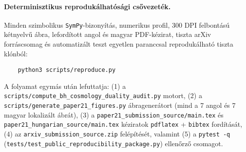 \documentclass[11pt,a4paper]{article}
\theoremstyle{remark}
\begin{document}
\paragraph{Determinisztikus reproduk\'alhat\'os\'agi cs\H{o}vezet\'ek.}
Minden szimbolikus \texttt{SymPy}-bizony\'it\'as, numerikus profil, 300 DPI felbont\'as\'u k\'etnyelv\H{u} \'abra, leford\'itott angol \'es magyar PDF-k\'ezirat, tiszta arXiv forr\'ascsomag \'es automatiz\'alt teszt egyetlen paranccsal reproduk\'alhat\'o tiszta kl\'onb\'ol:
\begin{verbatim}
    python3 scripts/reproduce.py
\end{verbatim}
A folyamat egym\'as ut\'an lefuttatja: (1) a \texttt{scripts/\allowbreak compute\_\allowbreak bh\_\allowbreak cosmology\_\allowbreak duality\_\allowbreak audit.py} motort, (2) a \texttt{scripts/\allowbreak generate\_\allowbreak paper21\_\allowbreak figures.py} \'abragener\'atort (mind a 7 angol \'es 7 magyar lokaliz\'alt \'abr\'at), (3) a \texttt{paper21\_\allowbreak submission\_\allowbreak source/\allowbreak main.tex} \'es \texttt{paper21\_\allowbreak hungarian\_\allowbreak source/\allowbreak main.tex} k\'eziratok \texttt{pdflatex} + \texttt{bibtex} ford\'it\'as\'at, (4) az \texttt{arxiv\_\allowbreak submission\_\allowbreak source.zip} fel\'ep\'it\'es\'et, valamint (5) a \texttt{pytest -q} (\texttt{tests/\allowbreak test\_\allowbreak public\_\allowbreak reproducibility\_\allowbreak package.py}) ellen\H{o}rz\H{o} csomagot.



\end{document}
